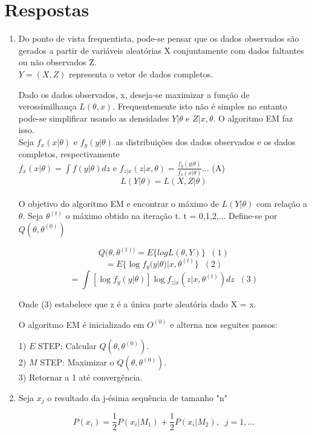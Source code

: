 \documentclass[a4paper,10pt, notitlepage]{report}
\begin{document}
	\section*{Respostas}
	
	\begin{enumerate}
		\item Do ponto de vista frequentista, pode-se pensar que os dados observados são gerados a partir de variáveis aleatórias X conjuntamente com dados faltantes ou não observados Z. \\
		$Y=(X,Z)$ representa o vetor de dados completos.
		
		Dado os dados observados, x, deseja-se maximizar a função de verossimilhança $L(\theta, x)$. Frequentemente isto não é simples no entanto pode-se simplificar usando as densidades $Y|\theta$ e $Z|x,\theta$. O algoritmo EM faz isso.\\
		
		Seja $f_x(x|\theta)$ e $f_y(y|\theta)$ as distribuições dos dados observados e os dados completos, respectivamente\\
		
		$f_x(x|\theta) = \int f(y|\theta) dz$ e $f_{z|x}(z|x,\theta) = \frac{f_y (y|\theta)}{f_x(x|\theta)}$... (A)\\
		$$L(Y|\theta) = L(X,Z|\theta)$$\\ O objetivo do algoritmo EM e encontrar o máximo de $L(Y|\theta)$ com relação a $\theta$. Seja $\theta^{(t)}$ o máximo obtido na iteração t. t = 0,1,2,... Define-se por $Q(\theta, \theta^{(0)})$
		
		$$Q(\theta, \theta^{(t))} = E\{log L(\theta, Y)\} \; \; (1)$$
		$$= E\{\log f_y(y|\theta)|x,\theta^{(t)}\} \; \; (2) $$
		$$= \int [\log f_y(y|\theta)] \log f_{z|x}(z| x,\theta^{(t)}) dz \; \; (3) $$
		
		Onde (3) estabelece que z é a única parte aleatória dado X = x.
		
		O algoritmo EM é inicializado em $O^{(0)}$ e alterna nos seguites passos:
		
		1) $E$ STEP: Calcular $Q(\theta, \theta^{(0)})$.\\
		2) $M$	STEP: Maximizar o $Q(\theta, \theta^{(0)})$.\\
		3) Retornar a 1 até convergência.
		
		\item Seja $x_j$ o resultado da j-ésima sequência de tamanho "n"
		
		$$P(x_i) = \frac{1}{2} P(x_i|M_1) + \frac{1}{2} P(x_i|M_2), \; \; j=1,...$$
		

\end{enumerate}
\end{document}
